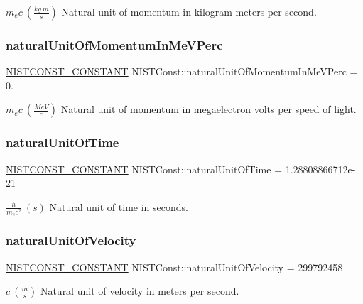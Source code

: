 $m_e c \ (\frac{kg\ m}{s})$ Natural unit of momentum in kilogram meters per second. \mbox{\label{group___n_i_s_t_const-_natural_unit_ga1768d322c0f9342d6fb5a30d1158a6ca}} 
\subsubsection{\texorpdfstring{natural\+Unit\+Of\+Momentum\+In\+Me\+V\+Perc}{naturalUnitOfMomentumInMeVPerc}}
{\footnotesize\ttfamily \mbox{\hyperlink{group___n_i_s_t_const-_macros_ga2b0fc1d7452373f816175dd86ce26729}{N\+I\+S\+T\+C\+O\+N\+S\+T\+\_\+\+C\+O\+N\+S\+T\+A\+NT}} N\+I\+S\+T\+Const\+::natural\+Unit\+Of\+Momentum\+In\+Me\+V\+Perc = 0.}

$m_e c \ (\frac{MeV}{c})$ Natural unit of momentum in megaelectron volts per speed of light. \mbox{\label{group___n_i_s_t_const-_natural_unit_gab65c3f69b157abb96800734bdc63f25d}} 
\subsubsection{\texorpdfstring{natural\+Unit\+Of\+Time}{naturalUnitOfTime}}
{\footnotesize\ttfamily \mbox{\hyperlink{group___n_i_s_t_const-_macros_ga2b0fc1d7452373f816175dd86ce26729}{N\+I\+S\+T\+C\+O\+N\+S\+T\+\_\+\+C\+O\+N\+S\+T\+A\+NT}} N\+I\+S\+T\+Const\+::natural\+Unit\+Of\+Time = 1.\+28808866712e-\/21}

$\frac{\hbar}{m_e c^2} \ (s)$ Natural unit of time in seconds. \mbox{\label{group___n_i_s_t_const-_natural_unit_ga89a69b160a137580df146f4407c5290b}} 
\subsubsection{\texorpdfstring{natural\+Unit\+Of\+Velocity}{naturalUnitOfVelocity}}
{\footnotesize\ttfamily \mbox{\hyperlink{group___n_i_s_t_const-_macros_ga2b0fc1d7452373f816175dd86ce26729}{N\+I\+S\+T\+C\+O\+N\+S\+T\+\_\+\+C\+O\+N\+S\+T\+A\+NT}} N\+I\+S\+T\+Const\+::natural\+Unit\+Of\+Velocity = 299792458}

$c \ (\frac{m}{s})$ Natural unit of velocity in meters per second. 
